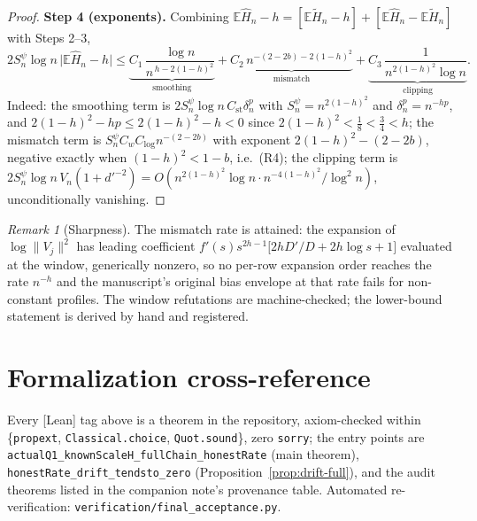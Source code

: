\documentclass[11pt]{article}
\theoremstyle{definition}
\theoremstyle{remark}
\newtheorem{remark}[theorem]{Remark}
\newcommand{\Wlean}{[Lean]}
\begin{document}
\begin{proof}
\textbf{Step 4 (exponents).} Combining
$\mathbb E\widehat H_n-h=[\mathbb E\widetilde H_n-h]+[\mathbb E\widehat
H_n-\mathbb E\widetilde H_n]$ with Steps 2--3,
\[
2S_n^{\psi}\log n\,\bigl|\mathbb E\widehat H_n-h\bigr|
\le
\underbrace{C_1\,\frac{\log n}{n^{\,h-2(1-h)^2}}}_{\text{smoothing}}
+\underbrace{C_2\,n^{-(2-2b)-2(1-h)^2}}_{\text{mismatch}}
+\underbrace{C_3\,\frac{1}{n^{2(1-h)^2}\log n}}_{\text{clipping}} .
\]
Indeed: the smoothing term is
$2S_n^{\psi}\log n\,C_{\mathrm{st}}\delta_n^{p}$ with
$S_n^{\psi}=n^{2(1-h)^2}$ and $\delta_n^p=n^{-hp}$, and
$2(1-h)^2-hp\le2(1-h)^2-h<0$ since $2(1-h)^2<\tfrac18<\tfrac34<h$; the
mismatch term is $S_n^{\psi}C_wC_{\log}n^{-(2-2b)}$ with exponent
$2(1-h)^2-(2-2b)$, negative exactly when $(1-h)^2<1-b$, i.e.\ (R4); the
clipping term is $2S_n^{\psi}\log n\,V_n(1+d'^{-2})
=O(n^{2(1-h)^2}\log n\cdot n^{-4(1-h)^2}/\log^2n)$, unconditionally
vanishing.
\end{proof}

\begin{remark}[Sharpness]
The mismatch rate is attained: the expansion of
$\log\|V_j\|^2$ has leading coefficient
$f'(s)s^{2h-1}\bigl[2hD'/D+2h\log s+1\bigr]$ evaluated at the window,
generically nonzero, so no per-row expansion order reaches the rate
$n^{-h}$ and the manuscript's original bias envelope at that rate fails for
non-constant profiles. The window refutations are machine-checked; the
lower-bound statement is derived by hand and registered.
\end{remark}

\section{Formalization cross-reference}

{\sloppy
Every \Wlean{} tag above is a theorem in the repository, axiom-checked within
\{\texttt{propext}, \texttt{Classical.\allowbreak{}choice}, \texttt{Quot.\allowbreak{}sound}\}, zero
\texttt{sorry}; the entry points are
\texttt{actualQ1\_\allowbreak\hspace{0pt}knownScaleH\_\allowbreak\hspace{0pt}fullChain\_\allowbreak\hspace{0pt}honestRate} (main theorem),
\texttt{honestRate\_\allowbreak{}drift\_\allowbreak{}tendsto\_\allowbreak{}zero} (Proposition~\ref{prop:drift-full}),
and the audit theorems listed in the companion note's provenance table.
Automated re-verification: \texttt{verification/\allowbreak{}final\_\allowbreak{}acceptance.\allowbreak{}py}.
\par}
\end{document}
